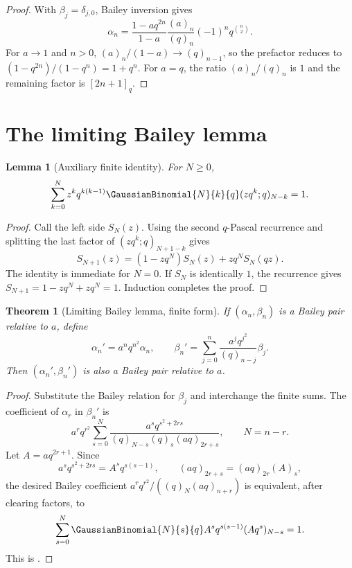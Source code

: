 \documentclass[11pt,a4paper,oneside,openany]{book}
\newtheorem{theorem}{Theorem}[chapter]
\newtheorem{lemma}[lemma]{Lemma}
\theoremstyle{definition}
\theoremstyle{remark}
\begin{document}
\begin{proof}
With $\beta_j=\delta_{j,0}$, Bailey inversion gives
\[
 \alpha_n=\frac{1-aq^{2n}}{1-a}
 \frac{(a)_n}{(q)_n}(-1)^nq^{\binom n2}.
\]
For $a\to1$ and $n>0$, $(a)_n/(1-a)\to(q)_{n-1}$, so the prefactor reduces to
\(
 (1-q^{2n})/(1-q^n)=1+q^n.
\)
For $a=q$, the ratio $(a)_n/(q)_n$ is $1$ and the remaining factor is $[2n+1]_q$.
\end{proof}

\section{The limiting Bailey lemma}

\begin{lemma}[Auxiliary finite identity]\label{lem:bailey-aux}
For $N\ge0$,
\[
 \sum_{k=0}^{N}z^kq^{k(k-1)}\GaussianBinomial{N}{k}{q}
 (zq^k;q)_{N-k}=1.
\]
\end{lemma}

\begin{proof}
Call the left side $S_N(z)$.  Using the second $q$-Pascal recurrence and splitting the last factor of $(zq^k;q)_{N+1-k}$ gives
\[
 S_{N+1}(z)=(1-zq^N)S_N(z)+zq^NS_N(qz).
\]
The identity is immediate for $N=0$.  If $S_N$ is identically $1$, the recurrence gives $S_{N+1}=1-zq^N+zq^N=1$.  Induction completes the proof.
\end{proof}

\begin{theorem}[Limiting Bailey lemma, finite form]\label{thm:bailey-limit-finite}
If $(\alpha_n,\beta_n)$ is a Bailey pair relative to $a$, define
\[
 \alpha_n'=a^nq^{n^2}\alpha_n,
 \qquad
 \beta_n'=\sum_{j=0}^{n}\frac{a^jq^{j^2}}{(q)_{n-j}}\beta_j.
\]
Then $(\alpha_n',\beta_n')$ is also a Bailey pair relative to $a$.
\end{theorem}

\begin{proof}
Substitute the Bailey relation for $\beta_j$ and interchange the finite sums.  The coefficient of $\alpha_r$ in $\beta_n'$ is
\[
 a^rq^{r^2}\sum_{s=0}^{N}
 \frac{a^sq^{s^2+2rs}}
 {(q)_{N-s}(q)_s(aq)_{2r+s}},
 \qquad N=n-r.
\]
Let $A=aq^{2r+1}$.  Since
\[
 a^sq^{s^2+2rs}=A^sq^{s(s-1)},
 \qquad
 (aq)_{2r+s}=(aq)_{2r}(A)_s,
\]
the desired Bailey coefficient
\(
 a^rq^{r^2}/((q)_N(aq)_{n+r})
\)
is equivalent, after clearing factors, to
\[
 \sum_{s=0}^{N}\GaussianBinomial{N}{s}{q} A^sq^{s(s-1)}(Aq^s)_{N-s}=1.
\]
This is .
\end{proof}
\end{document}
